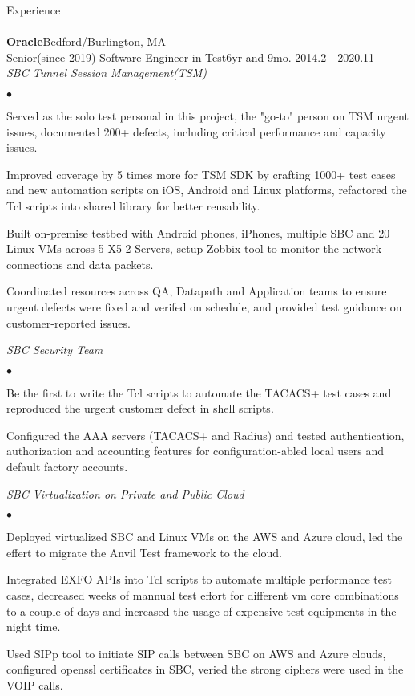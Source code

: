 \documentclass[10pt]{article}
\newcommand{\lineunder}{\vspace*{-8pt}\\\hspace*{-18pt}\hrulefill\\}
\newcommand{\header}[1]{{\hspace*{-15pt}\vspace*{6pt}\large{{#1}}}\vspace*{-6pt}\lineunder}
\newcommand{\company}[5]{
    \large{\textbf{#1}}\hfill \small{#3}\\
    #2\hfill \small{#4}\small{#5}\\
}
\newcommand{\project}[1]{\checkmark\normalsize{{\emph{#1}}}\\}
\newenvironment{achievements}
    {\begin{list}
        {$\bullet$}{\topsep 0pt \itemsep -1pt}} 
    {\end{list}}
\begin{document}
\header{Experience}


\company{Oracle}{Senior(since 2019) Software Engineer in Test}{Bedford/Burlington, MA}{6yr and 9mo. }{2014.2 - 2020.11}

\project{SBC Tunnel Session Management(TSM)}
  \begin{achievements}
\item Served as the solo test personal in this project, the "go-to" person on TSM urgent issues, documented 200+ defects, including critical performance and capacity issues.

\item Improved coverage by 5 times more for TSM SDK by crafting 1000+ test cases and new automation scripts on iOS, Android and Linux platforms, refactored the Tcl scripts into shared library for better reusability.
\item Built on-premise testbed with Android phones, iPhones, multiple SBC and 20 Linux VMs across 5 X5-2 Servers, setup Zobbix tool to monitor the network connections and data packets.
\item Coordinated resources across QA, Datapath and Application teams to ensure urgent defects were fixed and verifed on schedule, and provided test guidance on customer-reported issues.
  \end{achievements}


\project{SBC Security Team}
  \begin{achievements}
\item Be the first to write the Tcl scripts to automate the TACACS+ test cases and reproduced the urgent customer defect in shell scripts.
\item Configured the AAA servers (TACACS+ and Radius) and tested authentication, authorization and accounting features for configuration-abled local users and default factory accounts.
  \end{achievements}


  \project{SBC Virtualization on Private and Public Cloud}
  \begin{achievements}
\item Deployed virtualized SBC and Linux VMs on the AWS and Azure cloud, led the effert to migrate the Anvil Test framework to the cloud.
\item Integrated EXFO APIs into Tcl scripts to automate multiple performance test cases, decreased weeks of mannual test effort for different vm core combinations to a couple of days and increased the usage of expensive test equipments in the night time.
\item Used SIPp tool to initiate SIP calls between SBC on AWS and Azure clouds, configured openssl certificates in SBC, veried the strong ciphers were used in the VOIP calls.
  \end{achievements}
\end{document}
